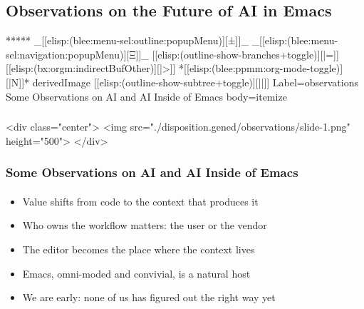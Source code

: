 \begin{whenOrg}
\section{Observations on the Future of AI in Emacs}

\begin{whenOrg}
*****  _[[elisp:(blee:menu-sel:outline:popupMenu)][±]]_ _[[elisp:(blee:menu-sel:navigation:popupMenu)][Ξ]]_ [[elisp:(outline-show-branches+toggle)][|=]] [[elisp:(bx:orgm:indirectBufOther)][|>]] *[[elisp:(blee:ppmm:org-mode-toggle)][|N]]*  derivedImage [[elisp:(outline-show-subtree+toggle)][||]] Label=observations Some Observations on AI and AI Inside of Emacs body=itemize
\end{whenOrg}

\begin{htmlonly}

\begin{frame}[fragile,plain,label=observations]
    \frametitle{}
    \framesubtitle{}
    \begin{rawhtml}
<div class="center">
<img src="./disposition.gened/observations/slide-1.png" height="500">
</div>
    \end{rawhtml}
\end{frame}
\end{htmlonly}

\begin{verblatex}

\begin{frame}[fragile,plain,label=observations]
    \frametitle{Some Observations on AI and AI Inside of Emacs}
    \framesubtitle{}

\begin{itemize}
  \item Value shifts from code to the context that produces it
  \item Who owns the workflow matters: the user or the vendor
  \item The editor becomes the place where the context lives
  \item Emacs, omni-moded and convivial, is a natural host
  \item We are early: none of us has figured out the right way yet
  \end{itemize}


\end{frame}
\end{verblatex}
\end{whenOrg}
